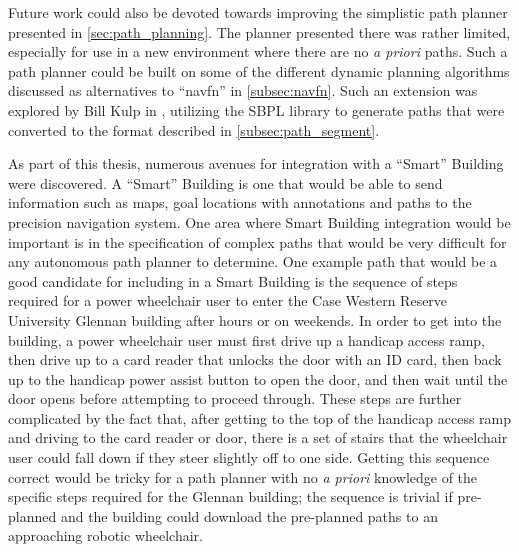 Future work could also be devoted towards improving the simplistic path planner presented in \autoref{sec:path_planning}. The planner presented there was rather limited, especially for use in a new environment where there are no \emph{a priori} paths. Such a path planner could be built on some of the different dynamic planning algorithms discussed as alternatives to ``navfn'' in \autoref{subsec:navfn}. Such an extension was explored by Bill Kulp in \autocite{Kulp2012}, utilizing the SBPL library \autocite{Likhachev2010} to generate paths that were converted to the format described in \autoref{subsec:path_segment}.

As part of this thesis, numerous avenues for integration with a ``Smart'' Building were discovered. A ``Smart'' Building is one that would be able to send information such as maps, goal locations with annotations and paths to the precision navigation system. One area where Smart Building integration would be important is in the specification of complex paths that would be very difficult for any autonomous path planner to determine. One example path that would be a good candidate for including in a Smart Building is the sequence of steps required for a power wheelchair user to enter the Case Western Reserve University Glennan building after hours or on weekends. In order to get into the building, a power wheelchair user must first drive up a handicap access ramp, then drive up to a card reader that unlocks the door with an ID card, then back up to the handicap power assist button to open the door, and then wait until the door opens before attempting to proceed through. These steps are further complicated by the fact that, after getting to the top of the handicap access ramp and driving to the card reader or door, there is a set of stairs that the wheelchair user could fall down if they steer slightly off to one side. Getting this sequence correct would be tricky for a path planner with no \emph{a priori} knowledge of the specific steps required for the Glennan building; the sequence is trivial if pre-planned and the building could download the pre-planned paths to an approaching robotic wheelchair.

\begin{comment}

Details possible areas to expand on this thesis and improve it's performance on our wheelchair platform

Talk about things where a Smart Building can \emph{definitely} help the precision navigation out. Some are obvious such as goal annotation so that things like ``kitchen'' mean something, but others are less obvious.

One of those would be things that would be tricky, even for a good path planner, such as the approach to get into Glennan from the quad-level.

\end{comment}